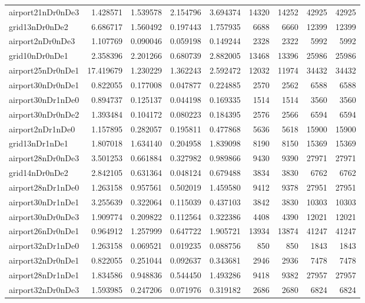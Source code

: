 \begin{longtable}{|l|r|r|r|r|r|r|r|r|}
airport21nDr0nDe3 & 1.428571 & 1.539578 & 2.154796 & 3.694374 & 14320 & 14252 & 42925 & 42925 \\
grid13nDr0nDe2 & 6.686717 & 1.560492 & 0.197443 & 1.757935 & 6688 & 6660 & 12399 & 12399 \\
airport2nDr0nDe3 & 1.107769 & 0.090046 & 0.059198 & 0.149244 & 2328 & 2322 & 5992 & 5992 \\
grid10nDr0nDe1 & 2.358396 & 2.201266 & 0.680739 & 2.882005 & 13468 & 13396 & 25986 & 25986 \\
airport25nDr0nDe1 & 17.419679 & 1.230229 & 1.362243 & 2.592472 & 12032 & 11974 & 34432 & 34432 \\
airport30nDr0nDe1 & 0.822055 & 0.177008 & 0.047877 & 0.224885 & 2570 & 2562 & 6588 & 6588 \\
airport30nDr1nDe0 & 0.894737 & 0.125137 & 0.044198 & 0.169335 & 1514 & 1514 & 3560 & 3560 \\
airport30nDr0nDe2 & 1.393484 & 0.104172 & 0.080223 & 0.184395 & 2576 & 2566 & 6594 & 6594 \\
airport2nDr1nDe0 & 1.157895 & 0.282057 & 0.195811 & 0.477868 & 5636 & 5618 & 15900 & 15900 \\
grid13nDr1nDe1 & 1.807018 & 1.634140 & 0.204958 & 1.839098 & 8190 & 8150 & 15369 & 15369 \\
airport28nDr0nDe3 & 3.501253 & 0.661884 & 0.327982 & 0.989866 & 9430 & 9390 & 27971 & 27971 \\
grid14nDr0nDe2 & 2.842105 & 0.631364 & 0.048124 & 0.679488 & 3834 & 3830 & 6762 & 6762 \\
airport28nDr1nDe0 & 1.263158 & 0.957561 & 0.502019 & 1.459580 & 9412 & 9378 & 27951 & 27951 \\
airport30nDr1nDe1 & 3.255639 & 0.322064 & 0.115039 & 0.437103 & 3842 & 3830 & 10303 & 10303 \\
airport30nDr0nDe3 & 1.909774 & 0.209822 & 0.112564 & 0.322386 & 4408 & 4390 & 12021 & 12021 \\
airport26nDr0nDe1 & 0.964912 & 1.257999 & 0.647722 & 1.905721 & 13934 & 13874 & 41247 & 41247 \\
airport32nDr1nDe0 & 1.263158 & 0.069521 & 0.019235 & 0.088756 & 850 & 850 & 1843 & 1843 \\
airport32nDr0nDe1 & 0.822055 & 0.251044 & 0.092637 & 0.343681 & 2946 & 2936 & 7478 & 7478 \\
airport28nDr1nDe1 & 1.834586 & 0.948836 & 0.544450 & 1.493286 & 9418 & 9382 & 27957 & 27957 \\
airport32nDr0nDe3 & 1.593985 & 0.247206 & 0.071976 & 0.319182 & 2686 & 2680 & 6824 & 6824 \\

\end{longtable}
